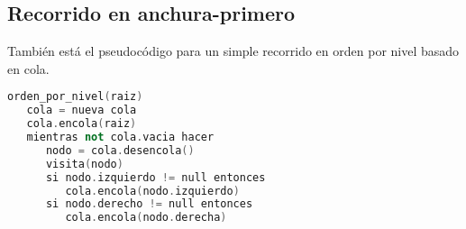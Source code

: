\subsection{Recorrido en anchura-primero}

También está el pseudocódigo para un simple recorrido en orden por nivel basado en cola.

\begin{lstlisting}[language=C++]
orden_por_nivel(raiz)
   cola = nueva cola
   cola.encola(raiz)
   mientras not cola.vacia hacer
      nodo = cola.desencola()
      visita(nodo)
      si nodo.izquierdo != null entonces
         cola.encola(nodo.izquierdo)
      si nodo.derecho != null entonces
         cola.encola(nodo.derecha)
\end{lstlisting}